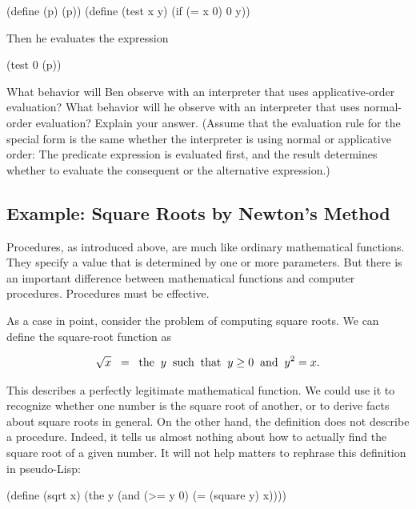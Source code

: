 \begin{exerciseGroup}
\begin{codeBlock}
(define (p) (p))
(define (test x y)
  (if (= x 0) 0 y))
\end{codeBlock}

Then he evaluates the expression

\begin{codeBlock}
(test 0 (p))
\end{codeBlock}

What behavior will Ben observe with an interpreter that uses applicative-order
evaluation?  What behavior will he observe with an interpreter that uses
normal-order evaluation?  Explain your answer.  (Assume that the evaluation
rule for the special form  is the same whether the interpreter is
using normal or applicative order: The predicate expression is evaluated first,
and the result determines whether to evaluate the consequent or the alternative
expression.)
\end{exerciseGroup}

\subsection{Example: Square Roots by Newton's Method}
\label{Section 1.1.7}

Procedures, as introduced above, are much like ordinary mathematical functions.
They specify a value that is determined by one or more parameters.  But there
is an important difference between mathematical functions and computer
procedures.  Procedures must be effective.

As a case in point, consider the problem of computing square roots.  We can
define the square-root function as

$$\sqrt{x}\;\; = {\rm\;\; the\;\;} y
{\rm\;\; such\;\; that\;\;} y \ge 0 {\rm\;\; and\;\;} y^2 = x.$$

This describes a perfectly legitimate mathematical function.  We could use it
to recognize whether one number is the square root of another, or to derive
facts about square roots in general.  On the other hand, the definition does
not describe a procedure.  Indeed, it tells us almost nothing about how to
actually find the square root of a given number.  It will not help matters to
rephrase this definition in pseudo-Lisp:

\begin{codeBlock}
(define (sqrt x)
  (the y (and (>= y 0)
              (= (square y) x))))
\end{codeBlock}

